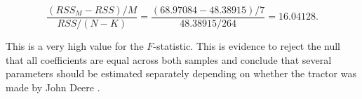 \documentclass[11pt]{paper}
\begin{document}
$$ 
\frac{(RSS_M - RSS)/M}{RSS/(N - K)} = \frac{(68.97084 - 48.38915)/7}{48.38915/264} = 16.04128. 
$$

This is a very high value for the $F$-statistic. 
This is evidence to reject the null that all 
coefficients are equal across both samples 
and conclude that 
several parameters should be estimated separately
depending on whether the tractor was made by John Deere .

\end{document}
